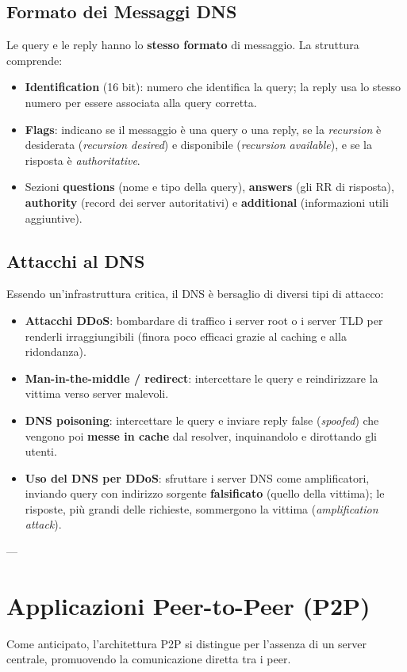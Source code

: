 \subsection{Formato dei Messaggi DNS}
Le query e le reply hanno lo \textbf{stesso formato} di messaggio. La struttura comprende:
\begin{itemize}
    \item \textbf{Identification} (16 bit): numero che identifica la query; la reply usa lo stesso numero per essere associata alla query corretta.
    \item \textbf{Flags}: indicano se il messaggio è una query o una reply, se la \textit{recursion} è desiderata (\textit{recursion desired}) e disponibile (\textit{recursion available}), e se la risposta è \textit{authoritative}.
    \item Sezioni \textbf{questions} (nome e tipo della query), \textbf{answers} (gli RR di risposta), \textbf{authority} (record dei server autoritativi) e \textbf{additional} (informazioni utili aggiuntive).
\end{itemize}

\subsection{Attacchi al DNS}
Essendo un'infrastruttura critica, il DNS è bersaglio di diversi tipi di attacco:
\begin{itemize}
    \item \textbf{Attacchi DDoS}: bombardare di traffico i server root o i server TLD per renderli irraggiungibili (finora poco efficaci grazie al caching e alla ridondanza).
    \item \textbf{Man-in-the-middle / redirect}: intercettare le query e reindirizzare la vittima verso server malevoli.
    \item \textbf{DNS poisoning}: intercettare le query e inviare reply false (\textit{spoofed}) che vengono poi \textbf{messe in cache} dal resolver, inquinandolo e dirottando gli utenti.
    \item \textbf{Uso del DNS per DDoS}: sfruttare i server DNS come amplificatori, inviando query con indirizzo sorgente \textbf{falsificato} (quello della vittima); le risposte, più grandi delle richieste, sommergono la vittima (\textit{amplification attack}).
\end{itemize}

---

\section{Applicazioni Peer-to-Peer (P2P)}
Come anticipato, l'architettura P2P si distingue per l'assenza di un server centrale, promuovendo la comunicazione diretta tra i peer.

